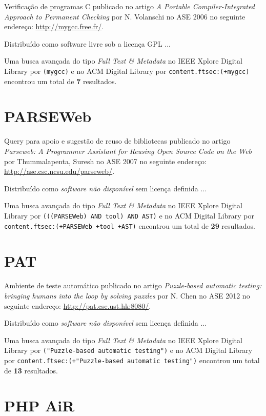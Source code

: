 Verificação de programas C
publicado no artigo
{\it A Portable Compiler-Integrated Approach to Permanent Checking}
por
N. Volanschi
no
ASE
2006
no seguinte endereço:
\url{http://mygcc.free.fr/}.

Distribuído como software livre
sob a licença GPL ...


Uma busca avançada do tipo {\it Full Text \& Metadata} no IEEE Xplore Digital Library por
\texttt{(mygcc)}
e no ACM Digital Library por
\texttt{content.ftsec:(+mygcc)}
encontrou um total de
{\bf 7}
resultados.

\section{PARSEWeb}

Query para apoio e sugestão de reuso de bibliotecas
publicado no artigo
{\it Parseweb: A Programmer Assistant for Reusing Open Source Code on the Web}
por
Thummalapenta, Suresh
no
ASE
2007
no seguinte endereço:
\url{http://ase.csc.ncsu.edu/parseweb/}.

Distribuído como {\it software não disponível}
sem licença definida ...


Uma busca avançada do tipo {\it Full Text \& Metadata} no IEEE Xplore Digital Library por
\texttt{(((PARSEWeb) AND tool) AND AST)}
e no ACM Digital Library por
\texttt{content.ftsec:(+PARSEWeb +tool +AST)}
encontrou um total de
{\bf 29}
resultados.

\section{PAT}

Ambiente de teste automático
publicado no artigo
{\it Puzzle-based automatic testing: bringing humans into the loop by solving puzzles}
por
N. Chen
no
ASE
2012
no seguinte endereço:
\url{http://pat.cse.ust.hk:8080/}.

Distribuído como {\it software não disponível}
sem licença definida ...


Uma busca avançada do tipo {\it Full Text \& Metadata} no IEEE Xplore Digital Library por
\texttt{("Puzzle-based automatic testing")}
e no ACM Digital Library por
\texttt{content.ftsec:(+"Puzzle-based automatic testing")}
encontrou um total de
{\bf 13}
resultados.

\section{PHP AiR}

